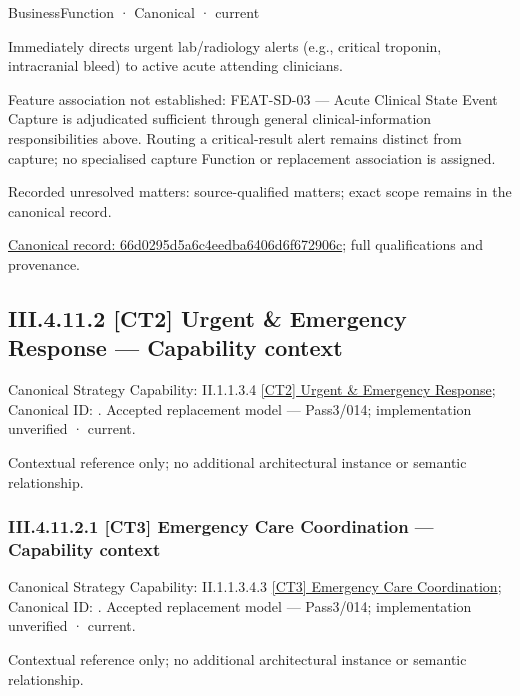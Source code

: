 \label{element:66d0295d5a6c4eedba6406d6f672906c}
{\small BusinessFunction · Canonical · current}\par

Immediately directs urgent lab/radiology alerts (e.g., critical troponin, intracranial bleed) to active acute attending clinicians.



Feature association not established: FEAT-SD-03 — Acute Clinical State Event Capture is adjudicated sufficient through general clinical-information responsibilities above. Routing a critical-result alert remains distinct from capture; no specialised capture Function or replacement association is assigned.


{\small Recorded unresolved matters: source-qualified matters; exact scope remains in the canonical record.}\par
{\footnotesize \href{../../../../continuum/business/business-function/66d0295d5a6c4eedba6406d6f672906c.md}{Canonical record: 66d0295d5a6c4eedba6406d6f672906c}; full qualifications and provenance.}\par
\subsection*{III.4.11.2 [CT2] Urgent \& Emergency Response — Capability context}
\label{navigation:III.4.11.2}

{\small Canonical Strategy Capability: II.1.1.3.4 \hyperref[element:d6c40bcfc84a4b758530edcaabfbd0ca]{[CT2] Urgent \& Emergency Response}; Canonical ID: \texttt{}. Accepted replacement model — Pass3/014; implementation unverified · current.}\par
Contextual reference only; no additional architectural instance or semantic relationship.\par
\subsubsection*{III.4.11.2.1 [CT3] Emergency Care Coordination — Capability context}
\label{navigation:III.4.11.2.1}

{\small Canonical Strategy Capability: II.1.1.3.4.3 \hyperref[element:22cb7ae4bd6b4c73aa2d8f5210eee460]{[CT3] Emergency Care Coordination}; Canonical ID: \texttt{}. Accepted replacement model — Pass3/014; implementation unverified · current.}\par
Contextual reference only; no additional architectural instance or semantic relationship.\par
